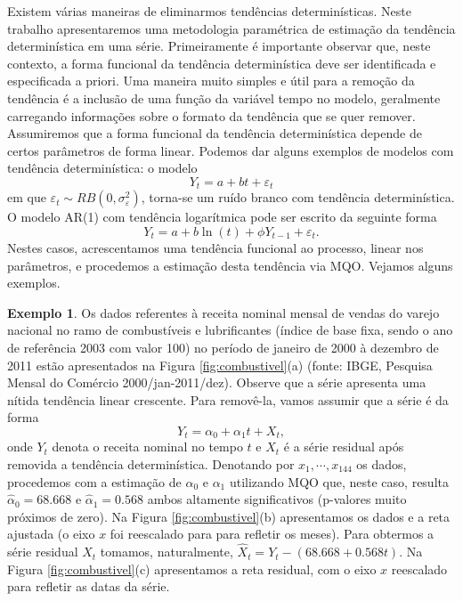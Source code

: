 \documentclass[
]{book}
\theoremstyle{definition}
\theoremstyle{definition}
\newtheorem{example}{Exemplo}[chapter]
\theoremstyle{definition}
\theoremstyle{remark}
\begin{document}
Existem várias maneiras de eliminarmos tendências determinísticas. Neste trabalho apresentaremos uma metodologia paramétrica de estimação da tendência determinística em uma série. Primeiramente é importante observar que, neste contexto, a forma funcional da tendência determinística deve ser identificada e especificada a priori. Uma maneira muito simples e útil para a remoção da tendência é a inclusão de uma função da variável tempo no modelo, geralmente carregando informações sobre o formato da tendência que se quer remover. Assumiremos que a forma funcional da tendência determinística depende de certos parâmetros de forma linear. Podemos dar alguns exemplos de modelos com tendência determinística: o modelo
\begin{equation}
Y_t=a + bt +\varepsilon_t
\end{equation}
em que \(\varepsilon_t\sim RB(0,\sigma_{\varepsilon}^2)\),
torna-se um ruído branco com tendência determinística. O modelo AR(1) com tendência logarítmica
pode ser escrito da seguinte forma
\begin{equation}
Y_t=a + b\ln(t)+\phi Y_{t-1} +\varepsilon_t.
\label{eq:modRBt}
\end{equation}
Nestes casos, acrescentamos uma tendência funcional ao processo, linear nos parâmetros, e procedemos a estimação desta tendência via MQO. Vejamos alguns exemplos.

\begin{example}
\protect\hypertarget{exm:combust}{}{\label{exm:combust} }Os dados referentes à receita nominal mensal de vendas do varejo nacional no ramo de combustíveis e lubrificantes (índice de base fixa, sendo o ano de referência 2003 com valor 100) no período de janeiro de 2000 à dezembro de 2011 estão apresentados na Figura \ref{fig:combustivel}(a) (fonte: IBGE, Pesquisa Mensal do Comércio 2000/jan-2011/dez). Observe que a série apresenta uma nítida tendência linear crescente. Para removê-la, vamos assumir que a série é da forma
\[Y_t=\alpha_0+\alpha_1t+X_t,\]
onde \(Y_t\) denota o receita nominal no tempo \(t\) e \(X_t\) é a série residual após removida a tendência determinística. Denotando por \(x_1,\cdots,x_{144}\) os dados, procedemos com a estimação de \(\alpha_0\) e \(\alpha_1\) utilizando MQO que, neste caso, resulta \(\hat\alpha_0=68.668\) e \(\hat\alpha_1=0.568\) ambos altamente significativos (p-valores muito próximos de zero). Na Figura \ref{fig:combustivel}(b) apresentamos os dados e a reta ajustada (o eixo \(x\) foi reescalado para para refletir os meses). Para obtermos a série residual \(X_t\) tomamos, naturalmente, \({\hat X}_t=Y_t-(68.668+0.568t)\). Na Figura \ref{fig:combustivel}(c) apresentamos a reta residual, com o eixo \(x\) reescalado para refletir as datas da série.
\end{example}
\end{document}
